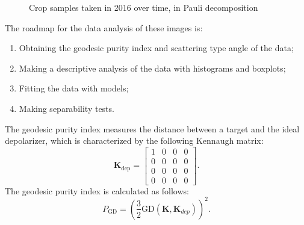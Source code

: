 \documentclass[12pt]{article}
\begin{document}
\begin{figure}[hbt]
  \centering
  \caption{Crop samples taken in 2016 over time, in Pauli decomposition}
  \label{fig:sample_images}
\end{figure}

The roadmap for the data analysis of these images is:
\begin{enumerate}
  \item Obtaining the geodesic purity index and scattering type angle of the data;
  \item Making a descriptive analysis of the data with histograms and boxplots;
  \item Fitting the data with models;
  \item Making separability tests.
\end{enumerate}

The geodesic purity index measures the distance between a target and the ideal depolarizer, which is characterized by the following Kennaugh matrix:
\[ \mathbf{K}_{\text{dep}} =
\begin{bmatrix}
1 & 0 & 0 & 0\\
0 & 0 & 0 & 0\\
0 & 0 & 0 & 0\\
0 & 0 & 0 & 0
\end{bmatrix}.
\]
The geodesic purity index is calculated as follows:
\begin{equation}
  P_{\text{GD}} = \left(\frac{3}{2}\text{GD}(\mathbf{K}, \mathbf{K}_{dep})\right)^2.
\end{equation}
\end{document}
